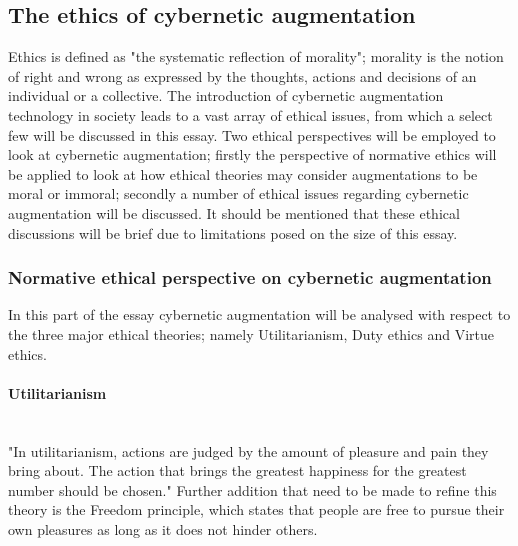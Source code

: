 \subsection{The ethics of cybernetic augmentation}

Ethics is defined as "the systematic reflection of morality"\cite[ch. 3.2]{Ethics_textbook}; morality is the notion of right and wrong as expressed by the thoughts, actions and decisions of an individual or a collective. The introduction of cybernetic augmentation technology in society leads to a vast array of ethical issues, from which a select few will be discussed in this essay. Two ethical perspectives will be employed to look at cybernetic augmentation; firstly the perspective of normative ethics will be applied to look at how ethical theories may consider augmentations to be moral or immoral; secondly a number of ethical issues regarding cybernetic augmentation will be discussed. It should be mentioned that these ethical discussions will be brief due to limitations posed on the size of this essay.



\subsubsection{Normative ethical perspective on cybernetic augmentation}

In this part of the essay cybernetic augmentation will be analysed with respect to the three major ethical theories; namely Utilitarianism, Duty ethics and Virtue ethics.

\paragraph{Utilitarianism} \\

"In utilitarianism, actions are judged by the amount of pleasure and pain they bring about. The action that brings the greatest happiness for the greatest number should be chosen." \cite[ch. 3.7]{Ethics_textbook} Further addition that need to be made to refine this theory is the Freedom principle, which states that people are free to pursue their own pleasures as long as it does not hinder others. 

